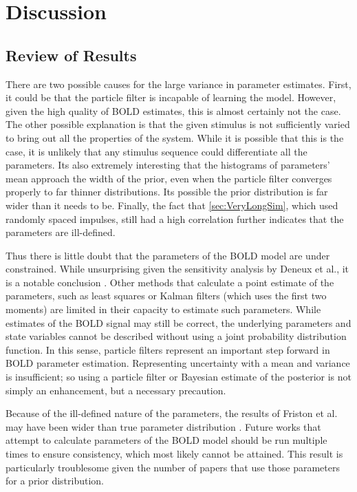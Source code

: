 \chapter{Discussion}
\label{sec:Discussion}
\section{Review of Results}
There are two possible causes for the large variance in
parameter estimates. First, it could be that the particle filter is
incapable of learning the model. However, given the high quality
of BOLD estimates, this is almost certainly not the case. The other
possible explanation is that the given stimulus is not sufficiently
varied to bring out all the properties of the system. While it is
possible that this is the case, it is unlikely that any
stimulus sequence could differentiate all the parameters.
Its also extremely interesting that the histograms of parameters' mean
approach the width of the prior, even when the particle filter converges
properly to far thinner distributions. Its possible the prior
distribution is far wider than
it needs to be. Finally, the fact that \autoref{sec:VeryLongSim}, which
used randomly spaced impulses,
still had a high correlation further indicates that the parameters
are ill-defined.

Thus there is little doubt that the parameters of the BOLD model are under
constrained. While unsurprising given the sensitivity analysis by Deneux et al.,
it is a notable conclusion \cite{Deneux2006}. Other methods
that calculate a point estimate of the parameters, such as least squares
or Kalman filters (which uses the first two moments) are limited in their
capacity to estimate such parameters. While estimates of
the  BOLD signal may still be correct, the
underlying parameters and state variables cannot be described without using
a joint probability distribution function. In this sense, particle
filters represent an important step forward in BOLD parameter
estimation. Representing uncertainty with a mean
and variance is insufficient; so using a particle filter
or Bayesian estimate of the posterior is not simply an enhancement,
but a necessary precaution.

Because of the ill-defined nature of the parameters, the results
of Friston et al. may have been wider than true parameter distribution
\cite{Friston2002}. Future works that attempt to calculate parameters
of the BOLD model should be run multiple times to ensure consistency,
which most likely cannot be attained. This result is particularly
troublesome given the number of papers that use those parameters for
a prior distribution.

